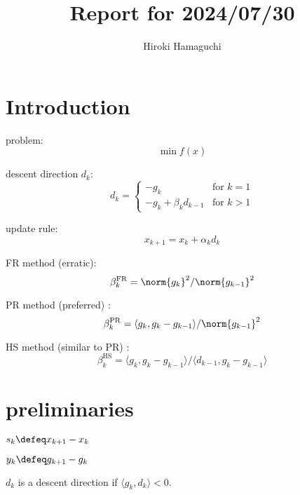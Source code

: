 \documentclass[\main/main]{subfiles}
\begin{document}
\title{Report for 2024/07/30}
\author{Hiroki Hamaguchi}
\maketitle


\section{Introduction}

problem:
\begin{equation}
    \min f(x)
\end{equation}

descent direction $d_k$:
\begin{equation}\label{eq:defOfDk}
    d_k = \begin{cases}
        -g_k                   & \text{for } k = 1 \\
        -g_k + \beta_k d_{k-1} & \text{for } k > 1
    \end{cases}
\end{equation}

update rule:
\begin{equation}
    x_{k+1} = x_k + \alpha_k d_k
\end{equation}

FR method (erratic):
\begin{equation}
    \beta_k^{\mathrm{FR}} = \norm{g_k}^2 / \norm{g_{k-1}}^2
\end{equation}

PR method (preferred) :
\begin{equation}
    \beta_k^{\mathrm{PR}} = \langle g_k , g_k - g_{k-1} \rangle / \norm{g_{k-1}}^2
\end{equation}

HS method (similar to PR) :
\begin{equation}
    \beta_k^{\mathrm{HS}} = \langle g_k ,g_k -g_{k-1} \rangle / \langle d_{k-1}, g_k - g_{k-1} \rangle
\end{equation}

\section{preliminaries}

$s_k \defeq x_{k+1} - x_k$

$y_k \defeq g_{k+1} - g_k$

$d_k$ is a descent direction if $\langle g_k, d_k \rangle < 0$.
\end{document}
